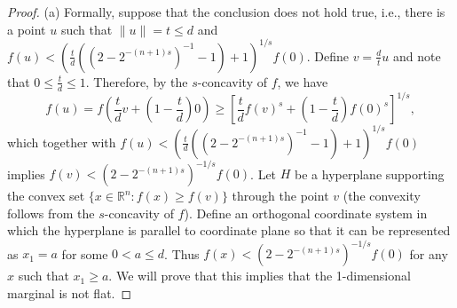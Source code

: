 \documentclass[11pt]{article}
\newcommand{\E}{\mathbb{E}}
\newcommand{\R}{\mathbb{R}}
\newcommand{\red}[1]{{\color{black}#1}}
\begin{document}
{{{{\medskip
\begin{proof}
(a) %
Formally, suppose that the conclusion does not hold true, i.e., there is a point $u$ such that $\|u\|=t\le d$ and \red{$f(u)<\left(\frac{t}{d}((2-2^{-(n+1)s})^{-1}-1)+1\right)^{1/s}f(0)$}. Define $v=\frac{d}{t}u$ and note that $0\le \frac{t}{d}\le 1$. Therefore, by the $s$-concavity of $f$, we have
\begin{equation*}
f(u)=f\left(\frac{t}{d}v+\left(1-\frac{t}{d}\right)0\right)\ge \left[\frac{t}{d}f(v)^s+\left(1-\frac{t}{d}\right)f(0)^s\right]^{1/s},
\end{equation*}
which together with $f(u)<\left(\frac{t}{d}((2-2^{-(n+1)s})^{-1}-1)+1\right)^{1/s}f(0)$ implies \red{$f(v)<(2-2^{-(n+1)s})^{-1/s}f(0)$}. Let $H$ be a hyperplane supporting the convex set $\{x\in\R^n: f(x)\ge f(v)\}$ through the point $v$ (the convexity follows from the $s$-concavity of $f$). Define an orthogonal coordinate system in which the hyperplane is parallel to coordinate plane so that it can be represented as $x_1=a$ for some $0<a\le d$. Thus \red{$f(x)<(2-2^{-(n+1)s})^{-1/s}f(0)$} for any $x$ such that $x_1\ge a$. We will prove that this implies that the 1-dimensional marginal is not flat.


\end{proof}}}}}
\end{document}
